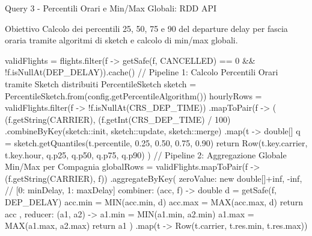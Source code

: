 \documentclass[10pt, aspectratio=169]{beamer}
\newcommand{\queryobjective}[1]{
    \vspace{-0.5cm}
    \begin{exampleblock}{\footnotesize Obiettivo}
    \scriptsize #1
    \end{exampleblock}
    \vfill
}
\begin{document}
\begin{frame}[fragile, t]{Query 3 - Percentili Orari e Min/Max Globali: RDD API}

    \queryobjective{Calcolo dei percentili 25, 50, 75 e 90 del departure delay per fascia oraria tramite algoritmi di sketch e calcolo di min/max globali.}

    \begin{rddcodebox}
validFlights = flights.filter(f -> getSafe(f, CANCELLED) == 0 && !f.isNullAt(DEP_DELAY)).cache()
// Pipeline 1: Calcolo Percentili Orari tramite Sketch distribuiti
PercentileSketch sketch = PercentileSketch.from(config.getPercentileAlgorithm())
hourlyRows = validFlights.filter(f -> !f.isNullAt(CRS_DEP_TIME))
    .mapToPair(f -> ( (f.getString(CARRIER), (f.getInt(CRS_DEP_TIME) / 100) %
    .combineByKey(sketch::init, sketch::update, sketch::merge)
    .map(t -> {
        double[] q = sketch.getQuantiles(t.percentile, 0.25, 0.50, 0.75, 0.90)
        return Row(t.key.carrier, t.key.hour, q.p25, q.p50, q.p75, q.p90)
    })
// Pipeline 2: Aggregazione Globale Min/Max per Compagnia
globalRows = validFlights.mapToPair(f -> (f.getString(CARRIER), f))
    .aggregateByKey(
        zeroValue: new double[]{+inf, -inf},  // [0: minDelay, 1: maxDelay]
        combiner: (acc, f) -> {
            double d = getSafe(f, DEP_DELAY)
            acc.min = MIN(acc.min, d)                   acc.max = MAX(acc.max, d)
            return acc
        },
        reducer: (a1, a2) -> {
            a1.min = MIN(a1.min, a2.min)                a1.max = MAX(a1.max, a2.max)
            return a1
        })
    .map(t -> Row(t.carrier, t.res.min, t.res.max))
    \end{rddcodebox}

\end{frame}
\end{document}
